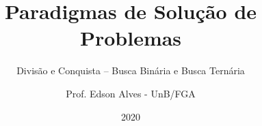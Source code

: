 \title{Paradigmas de Solução de Problemas}
\subtitle{Divisão e Conquista -- Busca Binária e Busca Ternária}
\author{Prof. Edson Alves - UnB/FGA}
\date{2020}
